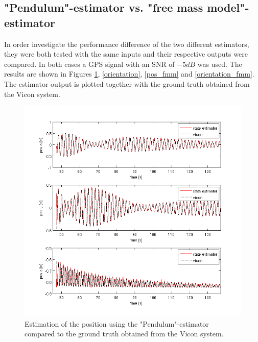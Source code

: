 \subsection{"Pendulum"-estimator vs. "free mass model"-estimator}\label{fmm}
In order investigate the performance difference of the two different estimators, they were both tested with the same inputs and their respective outputs were compared. In both cases a GPS signal with an SNR of $-5 dB$ was used. The results are shown in Figures \ref{pos}, \ref{orientation}, \ref{pos_fmm} and \ref{orientation_fmm}. The estimator output is plotted together with the ground truth obtained from the Vicon system.
\begin{figure}[h]
\centering
\includegraphics[width=1\textwidth]{pictures/2_2_SNR5_pos_GPS.png}
\caption{Estimation of the position using the "Pendulum"-estimator compared to the ground truth obtained from the Vicon system.}
\label{pos}
\end{figure}
